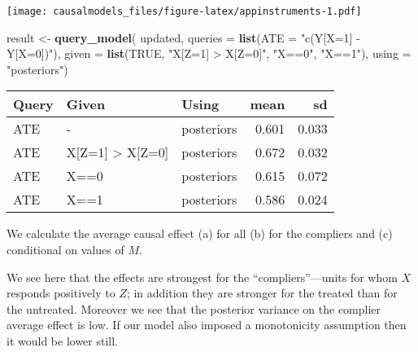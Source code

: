 \documentclass[
  12pt,
]{book}
\newenvironment{Shaded}{\begin{snugshade}}{\end{snugshade}}
\newcommand{\DataTypeTok}[1]{\textcolor[rgb]{0.13,0.29,0.53}{#1}}
\newcommand{\KeywordTok}[1]{\textcolor[rgb]{0.13,0.29,0.53}{\textbf{#1}}}
\newcommand{\NormalTok}[1]{#1}
\newcommand{\OperatorTok}[1]{\textcolor[rgb]{0.81,0.36,0.00}{\textbf{#1}}}
\newcommand{\OtherTok}[1]{\textcolor[rgb]{0.56,0.35,0.01}{#1}}
\newcommand{\StringTok}[1]{\textcolor[rgb]{0.31,0.60,0.02}{#1}}
\begin{document}
\texttt{[image: causalmodels\_files/figure-latex/appinstruments-1.pdf]}

\begin{Shaded}
\begin{Highlighting}[]
\NormalTok{result <-}\StringTok{ }\KeywordTok{query_model}\NormalTok{(}
\NormalTok{    updated, }
    \DataTypeTok{queries =} \KeywordTok{list}\NormalTok{(}\DataTypeTok{ATE =} \StringTok{"c(Y[X=1] - Y[X=0])"}\NormalTok{), }
    \DataTypeTok{given =} \KeywordTok{list}\NormalTok{(}\OtherTok{TRUE}\NormalTok{, }\StringTok{"X[Z=1] > X[Z=0]"}\NormalTok{,  }\StringTok{"X==0"}\NormalTok{,  }\StringTok{"X==1"}\NormalTok{),}
    \DataTypeTok{using =} \StringTok{"posteriors"}\NormalTok{)}
\end{Highlighting}
\end{Shaded}

\begin{tabular}{l|l|l|r|r}
\hline
Query & Given & Using & mean & sd\\
\hline
ATE & - & posteriors & 0.601 & 0.033\\
\hline
ATE & X[Z=1] > X[Z=0] & posteriors & 0.672 & 0.032\\
\hline
ATE & X==0 & posteriors & 0.615 & 0.072\\
\hline
ATE & X==1 & posteriors & 0.586 & 0.024\\
\hline
\end{tabular}

We calculate the average causal effect (a) for all (b) for the compliers and (c) conditional on values of \(M\).

We see here that the effects are strongest for the ``compliers''---units for whom \(X\) responds positively to \(Z\); in addition they are stronger for the treated than for the untreated. Moreover we see that the posterior variance on the complier average effect is low. If our model also imposed a monotonicity assumption then it would be lower still.

\begin{Shaded}
\end{Shaded}
\end{document}
